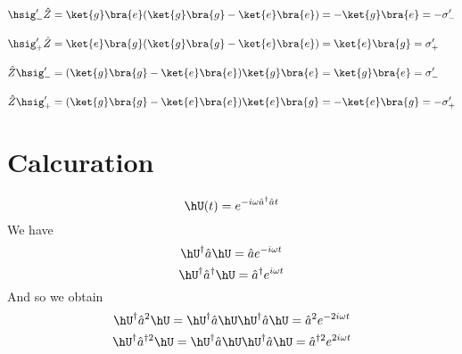 \begin{align}
    \hsig_-^\prime\hat{Z}&=\ket{g}\bra{e}(\ket{g}\bra{g}-\ket{e}\bra{e})=-\ket{g}\bra{e}=-\sigma_-^\prime\\[10pt]
    \hsig_+^\prime\hat{Z}&=\ket{e}\bra{g}(\ket{g}\bra{g}-\ket{e}\bra{e})=\ket{e}\bra{g}=\sigma_+^\prime\\[10pt]
    \hat{Z}\hsig_-^\prime&=(\ket{g}\bra{g}-\ket{e}\bra{e})\ket{g}\bra{e}=\ket{g}\bra{e}=\sigma_-^\prime\\[10pt]
    \hat{Z}\hsig_+^\prime&=(\ket{g}\bra{g}-\ket{e}\bra{e})\ket{e}\bra{g}=-\ket{e}\bra{g}=-\sigma_+^\prime
\end{align}



\section{Calcuration}
\begin{equation}
    \hU(t)=e^{-i\omega \hat{a}^\dag\hat{a}t}
\end{equation}
We have
\begin{equation}
    \hU^\dag\hat{a}\hU=\hat{a}e^{-i\omega t}
\end{equation}
\begin{equation}
    \hU^\dag\hat{a}^\dag\hU=\hat{a}^{\dagger}e^{i\omega t}
\end{equation}
And so we obtain
\begin{equation}
    \hU^\dag\hat{a}^2\hU=\hU^\dag\hat{a}\hU\hU^\dag\hat{a}\hU=\hat{a}^2e^{-2i\omega t}
\end{equation}
\begin{equation}
    \hU^\dag {{\hat{a}}^{\dag 2}} \hU=\hU^\dag\hat{a}\hU\hU^\dag\hat{a}\hU=\hat{a}^{\dag 2}e^{2i\omega t}
\end{equation}

